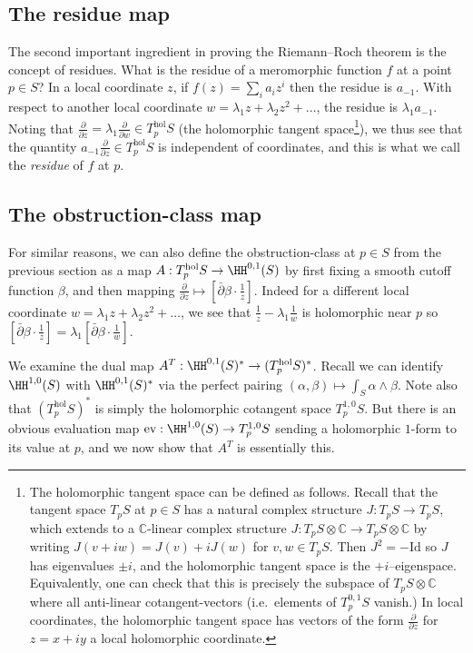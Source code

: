 \subsection{The residue map} The second important ingredient in proving the
Riemann--Roch theorem is the concept of residues. What is the residue of a
meromorphic function \(f\) at a point \(p\in S\)? In a local coordinate \(z\),
if \(f(z)=\sum_i a_i z^i\) then the residue is \(a_{-1}\). With respect to
another local coordinate \(w=\lambda_1 z + \lambda_2 z^2+\ldots\), the residue is
\(\lambda_1a_{-1}\).  Noting that \(\frac{\partial}{\partial z}=\lambda_1
\frac{\partial}{\partial w}\in T_p^\text{hol}S\) (the holomorphic tangent
space\footnote{The holomorphic tangent space can be defined as follows.
Recall that the tangent space \(T_pS\) at \(p\in S\) has a natural complex
structure \(J:T_pS\to T_pS\), which extends to a \(\mathbb{C}\)-linear complex
structure \(J:T_pS\otimes \mathbb{C}\to T_pS\otimes \mathbb{C}\) by writing
\(J(v+iw)=J(v)+iJ(w)\) for \(v,w\in T_pS\). Then \(J^2=-\text{Id}\) so \(J\) has
eigenvalues \(\pm i\), and the holomorphic tangent space is the
\(+i\)--eigenspace. Equivalently, one can check that this is precisely the
subspace of \(T_pS\otimes \mathbb{C}\) where all anti-linear cotangent-vectors
(i.e.\ elements of \(T_p^{0,1}S\) vanish.) In local coordinates, the holomorphic
tangent space has vectors of the form \(\frac{\partial}{\partial z}\) for
\(z=x+iy\) a local holomorphic coordinate.}), we thus see that the quantity
\(a_{-1}\frac{\partial}{\partial z}\in T_p^\text{hol}S\) is independent of
coordinates, and this is what we call the \textit{residue} of \(f\) at \(p\).

\subsection{The obstruction-class map} For similar reasons, we can also define
the obstruction-class at \(p\in S\) from the previous section as a map
\(A:T_p^\text{hol}S \to \HH^{0,1}(S)\) by first fixing a smooth cutoff function
\(\beta\), and then mapping \(\frac{\partial}{\partial z}\mapsto [\bar\partial
\beta\cdot \frac{1}{z}]\).  Indeed for a different local coordinate
\(w=\lambda_1z+\lambda_2z^2+\ldots\), we see that \(\frac{1}{z}-
\lambda_1\frac{1}{w}\) is holomorphic near \(p\) so \([\bar\partial \beta\cdot
\frac{1}{z}]=\lambda_1 [\bar\partial \beta\cdot \frac{1}{w}]\).

We examine the dual map \(A^T: \HH^{0,1}(S)^\ast \to (T_p^\text{hol}S)^\ast\).
Recall we can identify \(\HH^{1,0}(S)\) with \(\HH^{0,1}(S)^\ast\) via the
perfect pairing \((\alpha,\beta)\mapsto \int_S \alpha\wedge \beta\). Note also
that \((T_p^\text{hol}S)^\ast\) is simply the holomorphic cotangent space
\(T_p^{1,0}S\). But there is an obvious evaluation map
\(\text{ev}:\HH^{1,0}(S)\to T_p^{1,0}S\) sending a holomorphic \(1\)-form to its
value at \(p\), and we now show that \(A^T\) is essentially this.

